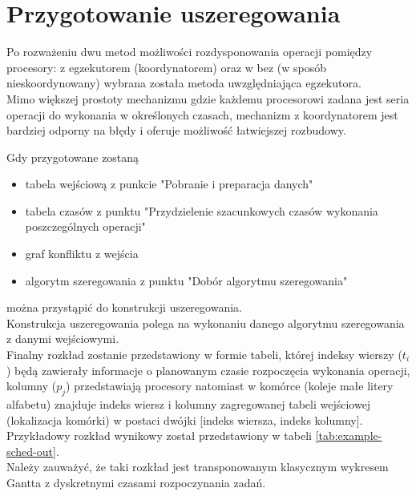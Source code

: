 \documentclass[brudnopis]{xmgr}
\begin{document}
\section{Przygotowanie uszeregowania}

Po rozważeniu dwu metod możliwości rozdysponowania operacji pomiędzy procesory: z egzekutorem (koordynatorem) oraz w bez (w sposób nieskoordynowany) wybrana została metoda uwzględniająca egzekutora.
\medskip\\

Mimo większej prostoty mechanizmu gdzie każdemu procesorowi zadana jest seria operacji do wykonania w określonych czasach, mechanizm z koordynatorem jest bardziej odporny na błędy i oferuje możliwość łatwiejszej rozbudowy.

Gdy przygotowane zostaną

\begin{itemize}
    \item tabela wejściową z punkcie "Pobranie i preparacja danych"
    \item tabela czasów z punktu "Przydzielenie szacunkowych czasów wykonania poszczególnych operacji"
    \item graf konfliktu z wejścia
    \item algorytm szeregowania z punktu "Dobór algorytmu szeregowania"
\end{itemize}

można przystąpić do konstrukcji uszeregowania.
\medskip\\

Konstrukcja uszeregowania polega na wykonaniu danego algorytmu szeregowania z danymi wejściowymi.
\medskip\\

Finalny rozkład zostanie przedstawiony w formie tabeli, której indeksy wierszy ($t_i$) będą zawierały informacje o planowanym czasie rozpoczęcia wykonania operacji, kolumny ($p_j$) przedstawiają procesory natomiast w komórce (koleje małe litery alfabetu) znajduje indeks wiersz i kolumny zagregowanej tabeli wejściowej (lokalizacja komórki) w postaci dwójki [indeks wiersza, indeks kolumny].
\medskip\\

Przykładowy rozkład wynikowy został przedstawiony w tabeli \ref{tab:example-sched-out}.
\medskip\\

Należy zauważyć, że taki rozkład jest transponowanym klasycznym wykresem Gantta z dyskretnymi czasami rozpoczynania zadań.
\end{document}
